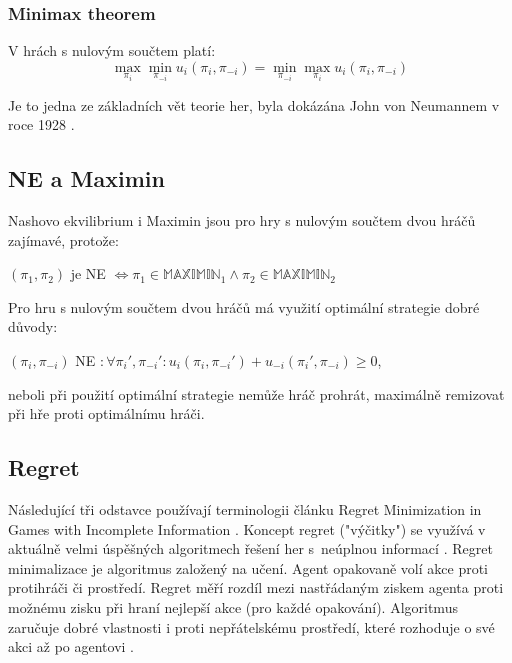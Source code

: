 \subsubsection{Minimax theorem}
V hrách s nulovým součtem platí: \cite{Schmid}
\begin{equation}
    \max_{\pi_i} \min_{\pi_{-i}} u_i(\pi_i, \pi_{-i}) = \min_{\pi_{-i}} \max_{\pi_i} u_i(\pi_i, \pi_{-i})
\end{equation}

Je to jedna ze základních vět teorie her, byla dokázána John von Neumannem v roce 1928 \cite{NeumannMinimax}.

\subsection{NE a Maximin}

Nashovo ekvilibrium i Maximin jsou pro hry s nulovým součtem dvou hráčů zajímavé, protože:

$(\pi_1, \pi_2)$ je NE $\Leftrightarrow \pi_1 \in \mathbb{MAXIMIN}_1 \land \pi_2 \in \mathbb{MAXIMIN}_2$  
\cite{Schmid}

Pro hru s nulovým součtem dvou hráčů má využití optimální strategie dobré důvody:  

$(\pi_i, \pi_{-i})$ NE $: \forall \pi_{i}', \pi_{-i}': u_i(\pi_i, \pi_{-i}') + u_{-i}(\pi_i', \pi_{-i}) \geq 0$,  

neboli při použití optimální strategie nemůže hráč prohrát, maximálně remizovat při hře proti optimálnímu hráči.
\cite{Schmid}

\subsection{Regret}
Následující tři odstavce používají terminologii článku Regret Minimization in Games with Incomplete Information \cite{RegretInImperfectInformation}.
Koncept regret ("výčitky") se využívá v aktuálně velmi úspěšných algoritmech řešení her s~neúplnou informací \cite{Schmid_2023}. Regret minimalizace je algoritmus založený na učení. Agent opakovaně volí akce proti protihráči či prostředí. Regret měří rozdíl mezi nastřádaným ziskem agenta proti možnému zisku při hraní nejlepší akce (pro každé opakování). Algoritmus zaručuje dobré vlastnosti i proti nepřátelskému prostředí, které rozhoduje o své akci až po agentovi \cite{Balko}. 

